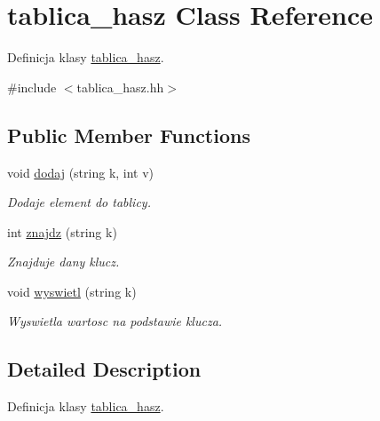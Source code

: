 \hypertarget{classtablica__hasz}{\section{tablica\-\_\-hasz \-Class \-Reference}
\label{classtablica__hasz}
}


\-Definicja klasy \hyperlink{classtablica__hasz}{tablica\-\_\-hasz}.  




{\ttfamily \#include $<$tablica\-\_\-hasz.\-hh$>$}

\subsection*{\-Public \-Member \-Functions}
\begin{DoxyCompactItemize}
\item 
void \hyperlink{classtablica__hasz_a29fe6592e0cb2d74494907daf2e59bd6}{dodaj} (string k, int v)
\begin{DoxyCompactList}\small\item\em \-Dodaje element do tablicy. \end{DoxyCompactList}\item 
\hypertarget{classtablica__hasz_a5e852de7fa7f32bbce9dff6b58eca5f7}{int \hyperlink{classtablica__hasz_a5e852de7fa7f32bbce9dff6b58eca5f7}{znajdz} (string k)}\label{classtablica__hasz_a5e852de7fa7f32bbce9dff6b58eca5f7}

\begin{DoxyCompactList}\small\item\em \-Znajduje dany klucz. \end{DoxyCompactList}\item 
\hypertarget{classtablica__hasz_aa214caa52bff1a7361fb166bdee122ad}{void \hyperlink{classtablica__hasz_aa214caa52bff1a7361fb166bdee122ad}{wyswietl} (string k)}\label{classtablica__hasz_aa214caa52bff1a7361fb166bdee122ad}

\begin{DoxyCompactList}\small\item\em \-Wyswietla wartosc na podstawie klucza. \end{DoxyCompactList}\end{DoxyCompactItemize}


\subsection{\-Detailed \-Description}
\-Definicja klasy \hyperlink{classtablica__hasz}{tablica\-\_\-hasz}. 

